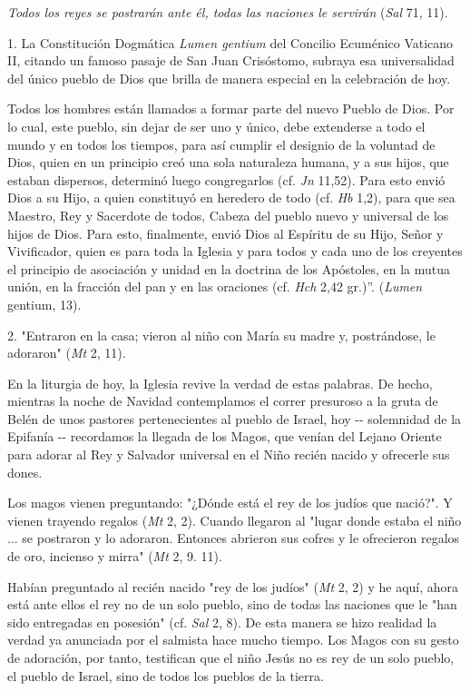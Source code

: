\begin{body}
\emph{Todos los reyes se postrarán ante él, todas las naciones le servirán} (\emph{Sal} 71, 11).

1. La Constitución Dogmática \emph{Lumen gentium} del Concilio Ecuménico Vaticano II, citando un famoso pasaje de San Juan Crisóstomo, subraya esa universalidad del único pueblo de Dios que brilla de manera especial en la celebración de hoy.

Todos los hombres están llamados a formar parte del nuevo Pueblo de Dios. Por lo cual, este pueblo, sin dejar de ser uno y único, debe extenderse a todo el mundo y en todos los tiempos, para así cumplir el designio de la voluntad de Dios, quien en un principio creó una sola naturaleza humana, y a sus hijos, que estaban dispersos, determinó luego congregarlos (cf. \emph{Jn} 11,52). Para esto envió Dios a su Hijo, a quien constituyó en heredero de todo (cf. \emph{Hb} 1,2), para que sea Maestro, Rey y Sacerdote de todos, Cabeza del pueblo nuevo y universal de los hijos de Dios. Para esto, finalmente, envió Dios al Espíritu de su Hijo, Señor y Vivificador, quien es para toda la Iglesia y para todos y cada uno de los creyentes el principio de asociación y unidad en la doctrina de los Apóstoles, en la mutua unión, en la fracción del pan y en las oraciones (cf. \emph{Hch} 2,42 gr.)''. (\emph{Lumen} gentium, 13).

2. "Entraron en la casa; vieron al niño con María su madre y, postrándose, le adoraron" (\emph{Mt} 2, 11).

En la liturgia de hoy, la Iglesia revive la verdad de estas palabras. De hecho, mientras la noche de Navidad contemplamos el correr presuroso a la gruta de Belén de unos pastores pertenecientes al pueblo de Israel, hoy -\/- solemnidad de la Epifanía -\/- recordamos la llegada de los Magos, que venían del Lejano Oriente para adorar al Rey y Salvador universal en el Niño recién nacido y ofrecerle sus dones.

Los magos vienen preguntando: "¿Dónde está el rey de los judíos que nació?". Y vienen trayendo regalos (\emph{Mt} 2, 2). Cuando llegaron al "lugar donde estaba el niño ... se postraron y lo adoraron. Entonces abrieron sus cofres y le ofrecieron regalos de oro, incienso y mirra" (\emph{Mt} 2, 9. 11).

Habían preguntado al recién nacido "rey de los judíos" (\emph{Mt} 2, 2) y he aquí, ahora está ante ellos el rey no de un solo pueblo, sino de todas las naciones que le "han sido entregadas en posesión" (cf. \emph{Sal} 2, 8). De esta manera se hizo realidad la verdad ya anunciada por el salmista hace mucho tiempo. Los Magos con su gesto de adoración, por tanto, testifican que el niño Jesús no es rey de un solo pueblo, el pueblo de Israel, sino de todos los pueblos de la tierra.


\end{body}
